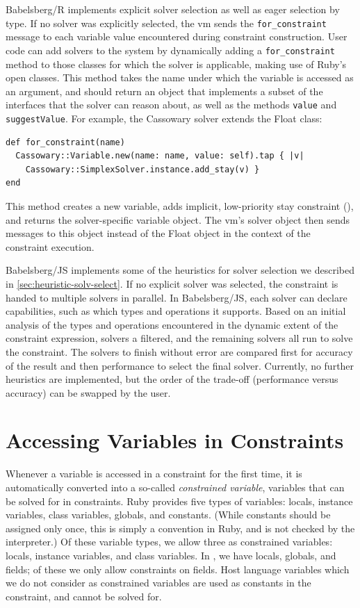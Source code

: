 Babelsberg/R implements explicit solver selection as well as eager selection by
type. If no solver was explicitly selected, the \ac{vm} sends the
\lstinline{for_constraint} message to each variable value encountered during
constraint construction. User code can add solvers to the system by dynamically
adding a \lstinline{for_constraint} method to those classes for which the solver
is applicable, making use of Ruby's open classes. This method takes the name
under which the variable is accessed as an argument, and should return an object
that implements a subset of the interfaces that the solver can reason about, as
well as the methods \lstinline{value} and \lstinline{suggestValue}. For example,
the Cassowary solver extends the Float class:
\begin{lstlisting}
def for_constraint(name)
  Cassowary::Variable.new(name: name, value: self).tap { |v|
    Cassowary::SimplexSolver.instance.add_stay(v) }
end
\end{lstlisting}
This method creates a new variable, adds implicit, low-priority stay constraint
(), and returns the solver-specific
variable object. The \ac{vm}'s solver object then sends messages to this object
instead of the Float object in the context of the constraint execution.

Babelsberg/JS implements some of the heuristics for solver selection we
described in \autoref{sec:heuristic-solv-select}. If no explicit solver was
selected, the constraint is handed to multiple solvers in parallel. In
Babelsberg/JS, each solver can declare capabilities, such as which types and
operations it supports. Based on an initial analysis of the types and operations
encountered in the dynamic extent of the constraint expression, solvers a
filtered, and the remaining solvers all run to solve the constraint. The solvers
to finish without error are compared first for accuracy of the result and then
performance to select the final solver. Currently, no further heuristics are
implemented, but the order of the trade-off (performance versus accuracy) can be
swapped by the user.

\section{Accessing Variables in Constraints}
\label{sec:conv-vari-constr}
Whenever a variable is accessed in a constraint for the first time, it is
automatically converted into a so-called \emph{constrained variable}, \ie
variables that can be solved for in constraints. Ruby provides five types of
variables: locals, instance variables, class variables, globals, and constants.
(While constants should be assigned only once, this is simply a convention in
Ruby, and is not checked by the interpreter.)  Of these variable types, we allow
three as constrained variables: locals, instance variables, and class
variables. In \javascript, we have locals, globals, and fields; of these we only
allow constraints on fields. Host language variables which we do not consider as
constrained variables are used as constants in the constraint, and cannot be
solved for.


